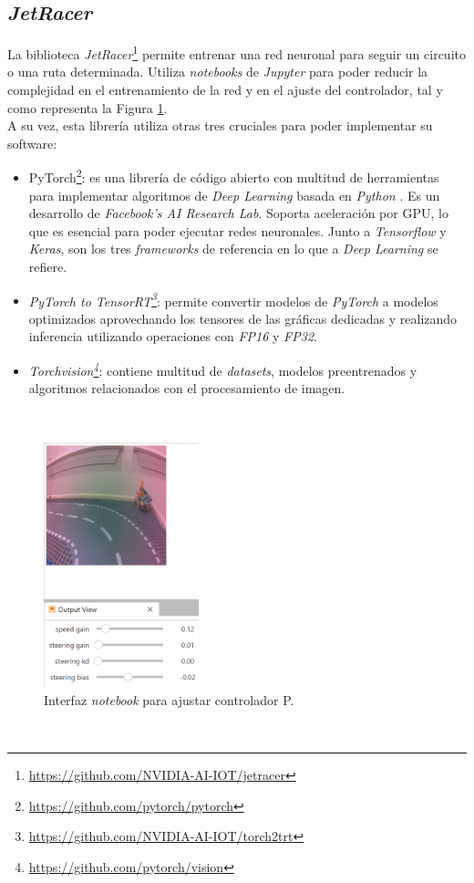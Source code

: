 \subsection{\textit{JetRacer}}
\label{subsection:jetracer}
La biblioteca \textit{JetRacer}\footnote{\url{https://github.com/NVIDIA-AI-IOT/jetracer}} permite entrenar una red neuronal para seguir un circuito o una ruta determinada. Utiliza \textit{notebooks} de \textit{Jupyter} para poder reducir la complejidad en el entrenamiento de la red y en el ajuste del controlador, tal y como representa la Figura \ref{fig:livejetracer}.\\
A su vez, esta librería utiliza otras tres cruciales para poder implementar su software:
\begin{itemize}
	\item PyTorch\footnote{\url{https://github.com/pytorch/pytorch}}: es una librería de código abierto con multitud de herramientas para implementar algoritmos de \textit{Deep Learning} basada en \textit{Python} \cite{autopilottesla}. Es un desarrollo de \textit{Facebook's AI Research Lab}. Soporta aceleración por GPU, lo que es esencial para poder ejecutar redes neuronales. Junto a \textit{Tensorflow} y \textit{Keras}, son los tres \textit{frameworks} de referencia en lo que a \textit{Deep Learning} se refiere.
	\item \textit{PyTorch to TensorRT\footnote{\url{https://github.com/NVIDIA-AI-IOT/torch2trt}}}: permite convertir modelos de \textit{PyTorch} a modelos optimizados aprovechando los tensores de las gráficas dedicadas y realizando inferencia utilizando operaciones con \textit{FP16} y \textit{FP32}.
	\item \textit{Torchvision\footnote{\url{https://github.com/pytorch/vision}}}: contiene multitud de \textit{datasets}, modelos preentrenados y algoritmos relacionados con el procesamiento de imagen.
\end{itemize}\
\begin{figure} [h!]
	\begin{center}
		\includegraphics[width=4.5cm]{figs/livejetracer}
	\end{center}
	\caption{Interfaz \textit{notebook} para ajustar controlador P.}
	\label{fig:livejetracer}
\end{figure}\

